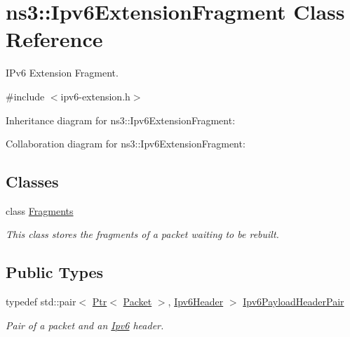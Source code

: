 \hypertarget{classns3_1_1Ipv6ExtensionFragment}{}\section{ns3\+:\+:Ipv6\+Extension\+Fragment Class Reference}
\label{classns3_1_1Ipv6ExtensionFragment}


I\+Pv6 Extension Fragment.  




{\ttfamily \#include $<$ipv6-\/extension.\+h$>$}



Inheritance diagram for ns3\+:\+:Ipv6\+Extension\+Fragment\+:


Collaboration diagram for ns3\+:\+:Ipv6\+Extension\+Fragment\+:
\subsection*{Classes}
\begin{DoxyCompactItemize}
\item 
class \hyperlink{classns3_1_1Ipv6ExtensionFragment_1_1Fragments}{Fragments}
\begin{DoxyCompactList}\small\item\em This class stores the fragments of a packet waiting to be rebuilt. \end{DoxyCompactList}\end{DoxyCompactItemize}
\subsection*{Public Types}
\begin{DoxyCompactItemize}
\item 
typedef std\+::pair$<$ \hyperlink{classns3_1_1Ptr}{Ptr}$<$ \hyperlink{classns3_1_1Packet}{Packet} $>$, \hyperlink{classns3_1_1Ipv6Header}{Ipv6\+Header} $>$ \hyperlink{classns3_1_1Ipv6ExtensionFragment_a52bf3800a9db6fe2eb1a1c2b3a4414d8}{Ipv6\+Payload\+Header\+Pair}
\begin{DoxyCompactList}\small\item\em Pair of a packet and an \hyperlink{classns3_1_1Ipv6}{Ipv6} header. \end{DoxyCompactList}\end{DoxyCompactItemize}
